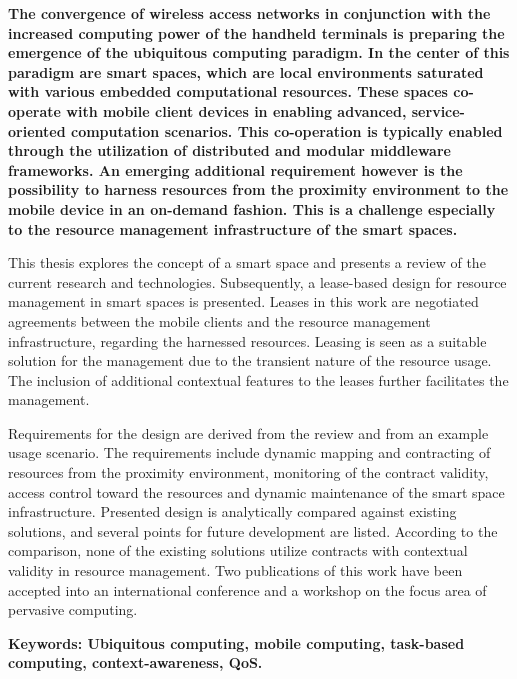 {\bfseries \noindent The convergence of wireless access networks in conjunction with the increased computing power of the handheld terminals is preparing the emergence of the ubiquitous computing paradigm. In the center of this paradigm are smart spaces, which are local environments saturated with various embedded computational resources. These spaces co-operate with mobile client devices in enabling advanced, service-oriented computation scenarios. This co-operation is typically enabled through the utilization of distributed and modular middleware frameworks. An emerging additional requirement however is the possibility to harness resources from the proximity environment to the mobile device in an on-demand fashion. This is a challenge especially to the resource management infrastructure of the smart spaces.

This thesis explores the concept of a smart space and presents a review of the current research and technologies. Subsequently, a lease-based design for resource management in smart spaces is presented. Leases in this work are negotiated agreements between the mobile clients and the resource management infrastructure, regarding the harnessed resources. Leasing is seen as a suitable solution for the management due to the transient nature of the resource usage. The inclusion of additional contextual features to the leases further facilitates the management.

Requirements for the design are derived from the review and from an example usage scenario. The requirements include dynamic mapping and contracting of resources from the proximity environment, monitoring of the contract validity, access control toward the resources and dynamic maintenance of the smart space infrastructure. Presented design is analytically compared against existing solutions, and several points for future development are listed. According to the comparison, none of the existing solutions utilize contracts with contextual validity in resource management. Two publications of this work have been accepted into an international conference and a workshop on the focus area of pervasive computing.

\vspace{1\baselineskip}
\noindent\textbf{Keywords: Ubiquitous computing, mobile computing, task-based computing, context-awareness, QoS.}
}
